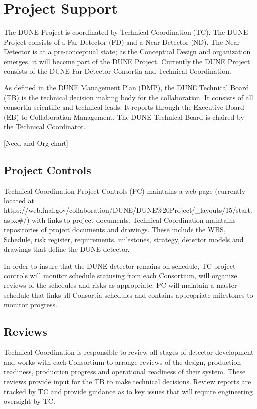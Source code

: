 \section{Project Support}
\label{sec:fdsp-coord-supp}

The DUNE Project is coordinated by Technical Coordination (TC). The DUNE
Project consists of a Far Detector (FD) and a Near Detector (ND). The Near
Detector is at a pre-conceptual state; as the Conceptual Design and
organization emerges, it will become part of the DUNE
Project. Currently the DUNE Project consists of the DUNE Far Detector
Consortia and Technical Coordination.

As defined in the DUNE Management Plan (DMP), the DUNE Technical Board (TB) is
the technical decision making body for the collaboration. It consists
of all consortia scientific and technical leads. It reports through
the Executive Board (EB) to Collaboration Management. The DUNE Technical
Board is chaired by the Technical Coordinator.

[Need and Org chart]


\subsection{Project Controls}
\label{sec:fdsp-coord-controls}

Technical Coordination Project Controls (PC) maintains a web page
(currently located at
{https://web.fnal.gov/collaboration/DUNE/DUNE\%20Project/\_layouts/15/start.aspx\#/})
with links to project documents. Technical Coordination maintains
repositories of project documents and drawings. These include the WBS,
Schedule, risk register, requirements, milestones, strategy, detector
models and drawings that define the DUNE detector.

In order to insure that the DUNE detector remains on schedule, TC
project controls will monitor schedule statusing from each Consortium,
will organize reviews of the schedules and risks as appropriate. PC
will maintain a master schedule that links all Consortia schedules and
contains appropriate milestones to monitor progress.

\subsection{Reviews}
\label{sec:fdsp-coord-reviews}

Technical Coordination is responsible to review all stages of detector
development and works with each Consortium to arrange reviews of the
design, production readiness, production progress and operational
readiness of their system.  These reviews provide input for the TB to
make technical decisions.  Review reports are tracked by TC and
provide guidance as to key issues that will require engineering
oversight by TC.

